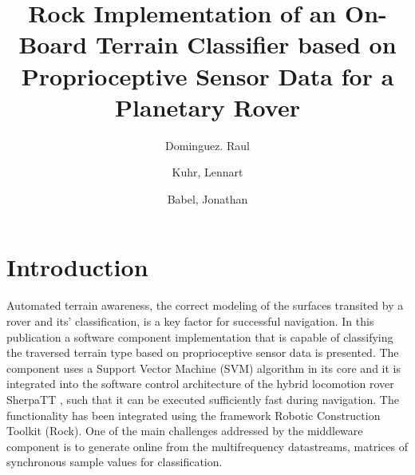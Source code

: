 \documentclass{article}
\title{Rock Implementation of an On-Board Terrain Classifier based on Proprioceptive Sensor Data for a Planetary Rover}
\author{
Dominguez. Raul \and Kuhr, Lennart \and Babel, Jonathan
}
\begin{document}
\maketitle



\section{Introduction}


Automated terrain awareness, the correct modeling of the surfaces transited by a rover and its’ classification, is a key factor for successful navigation. 
In this publication a software component implementation that is capable of classifying the traversed terrain type based on proprioceptive sensor data is presented. 
The component uses a Support Vector Machine (SVM) algorithm \cite{vapnik1992,cristianini2000} in its core and it is integrated into the software control architecture of the hybrid locomotion rover SherpaTT \cite{cordes2018}, such that it can be executed sufficiently fast during navigation. 
The functionality has been integrated using the framework Robotic Construction Toolkit (Rock).
One of the main challenges addressed by the middleware component is to generate online from the multifrequency datastreams, matrices of synchronous sample values for classification.
\end{document}
